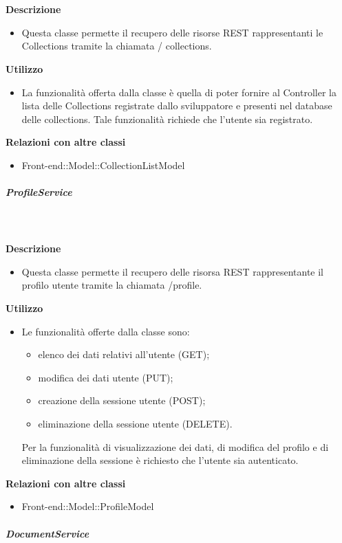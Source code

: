 				\textbf{\\ \\ Descrizione} 
					\begin{itemize}
						\item[] Questa classe permette il recupero delle risorse REST rappresentanti le Collections tramite la chiamata / collections.
					\end{itemize}      
				\textbf{Utilizzo}  
					\begin{itemize}
						\item[] La funzionalità offerta dalla classe è quella di poter fornire al Controller la lista delle Collections registrate dallo sviluppatore e presenti nel database delle collections.
Tale funzionalità richiede che l'utente sia registrato.
					\end{itemize}
					\textbf{Relazioni con altre classi}
					\begin{itemize}
							\item{Front-end::Model::CollectionListModel}
					\end{itemize}
			\subparagraph{ProfileService}
				
				\textbf{\\ \\ Descrizione} 
					\begin{itemize}
						\item[] Questa classe permette il recupero delle risorsa REST rappresentante il profilo utente tramite la chiamata /profile.
					\end{itemize}      
				\textbf{Utilizzo}  
					\begin{itemize}
						\item[] Le funzionalità offerte dalla classe sono:
\begin{itemize}
\item elenco dei dati relativi all'utente (GET);
\item modifica dei dati utente (PUT);
\item creazione della sessione utente (POST);
\item eliminazione della sessione utente (DELETE).
\end{itemize}

Per la funzionalità di visualizzazione dei dati, di modifica del profilo e di eliminazione della sessione è richiesto che l'utente sia autenticato.
					\end{itemize}
					\textbf{Relazioni con altre classi}
					\begin{itemize}
							\item{Front-end::Model::ProfileModel}
					\end{itemize}
			\subparagraph{DocumentService}
				
